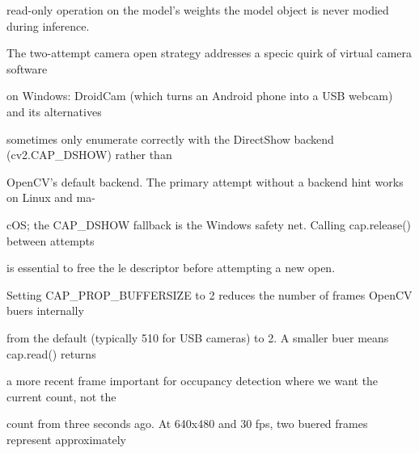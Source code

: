 read-only operation on the model's weights  the model object is never modied during inference.

The two-attempt camera open strategy addresses a specic quirk of virtual camera software

on Windows: DroidCam (which turns an Android phone into a USB webcam) and its alternatives

sometimes only enumerate correctly with the DirectShow backend (cv2.CAP\_DSHOW) rather than

OpenCV's default backend. The primary attempt without a backend hint works on Linux and ma-

cOS; the CAP\_DSHOW fallback is the Windows safety net. Calling cap.release() between attempts

is essential to free the le descriptor before attempting a new open.

Setting CAP\_PROP\_BUFFERSIZE to 2 reduces the number of frames OpenCV buers internally

from the default (typically 510 for USB cameras) to 2. A smaller buer means cap.read() returns

a more recent frame  important for occupancy detection where we want the current count, not the

count from three seconds ago. At 640x480 and 30 fps, two buered frames represent approximately

